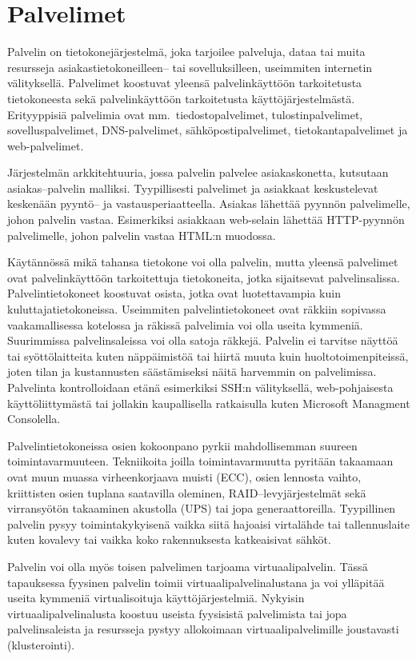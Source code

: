 \section{Palvelimet}\label{palvelimet}

Palvelin on tietokonejärjestelmä, joka tarjoilee palveluja, dataa tai muita resursseja asiakastietokoneilleen– tai sovelluksilleen, useimmiten internetin välityksellä. Palvelimet koostuvat yleensä palvelinkäyttöön tarkoitetusta tietokoneesta sekä palvelinkäyttöön tarkoitetusta käyttöjärjestelmästä. Erityyppisiä palvelimia ovat mm.\ tiedostopalvelimet, tulostinpalvelimet, sovelluspalvelimet, DNS-palvelimet, sähköpostipalvelimet, tietokantapalvelimet ja web-palvelimet.

Järjestelmän arkkitehtuuria, jossa palvelin palvelee asiakaskonetta, kutsutaan asiakas–palvelin malliksi. Tyypillisesti palvelimet ja asiakkaat keskustelevat keskenään pyyntö– ja vastausperiaatteella. Asiakas lähettää pyynnön palvelimelle, johon palvelin vastaa. Esimerkiksi asiakkaan web-selain lähettää HTTP-pyynnön palvelimelle, johon palvelin vastaa HTML:n muodossa.

Käytännössä mikä tahansa tietokone voi olla palvelin, mutta yleensä palvelimet ovat palvelinkäyttöön tarkoitettuja tietokoneita, jotka sijaitsevat palvelinsalissa. Palvelintietokoneet koostuvat osista, jotka ovat luotettavampia kuin kuluttajatietokoneissa. Useimmiten palvelintietokoneet ovat räkkiin sopivassa vaakamallisessa kotelossa ja räkissä palvelimia voi olla useita kymmeniä. Suurimmissa palvelinsaleissa voi olla satoja räkkejä. Palvelin ei tarvitse näyttöä tai syöttölaitteita kuten näppäimistöä tai hiirtä muuta kuin huoltotoimenpiteissä, joten tilan ja kustannusten säästämiseksi näitä harvemmin on palvelimissa. Palvelinta kontrolloidaan etänä esimerkiksi SSH:n välityksellä, web-pohjaisesta käyttöliittymästä tai jollakin kaupallisella ratkaisulla kuten Microsoft Managment Consolella.~\cite{paessler}

Palvelintietokoneissa osien kokoonpano pyrkii mahdollisemman suureen toimintavarmuuteen. Tekniikoita joilla toimintavarmuutta pyritään takaamaan ovat muun muassa virheenkorjaava muisti (ECC), osien lennosta vaihto, kriittisten osien tuplana saatavilla oleminen, RAID–levyjärjestelmät sekä virransyötön takaaminen akustolla (UPS) tai jopa generaattoreilla. Tyypillinen palvelin pysyy toimintakykyisenä vaikka siitä hajoaisi virtalähde tai tallennuslaite kuten kovalevy tai vaikka koko rakennuksesta katkeaisivat sähköt.

Palvelin voi olla myös toisen palvelimen tarjoama virtuaalipalvelin. Tässä tapauksessa fyysinen palvelin toimii virtuaalipalvelinalustana ja voi ylläpitää useita kymmeniä virtualisoituja käyttöjärjestelmiä. Nykyisin virtuaalipalvelinalusta koostuu useista fyysisistä palvelimista tai jopa palvelinsaleista ja resursseja pystyy allokoimaan virtuaalipalvelimille joustavasti (klusterointi).

